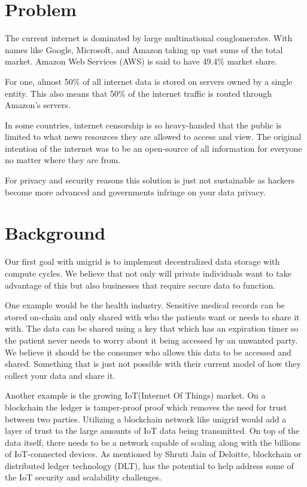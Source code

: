 \documentclass[12pt]{article}
\begin{document}
\newpage
\section*{Problem}

The current internet is dominated by large multinational conglomerates. With names like Google, Microsoft, and Amazon taking up vast sums of the total market. Amazon Web Services (AWS) is said to have 49.4\% market share\cite{jeb2019}.

For one, almost 50\% of all internet data is stored on servers owned by a single entity\cite{jeb2019}. This also means that 50\% of the internet traffic is routed through Amazon’s servers\cite{jeb2019}.

In some countries, internet censorship is so heavy-handed that the public is limited to what news resources they are allowed to access and view\cite{wiki2021}. The original intention of the internet was to be an open-source of all information for everyone no matter where they are from.

For privacy and security reasons this solution is just not sustainable as hackers become more advanced and governments infringe on your data privacy.


\section*{Background}
Our first goal with unigrid is to implement decentralized data storage with compute cycles. We believe that not only will private individuals want to take advantage of this but also businesses that require secure data to function.

One example would be the health industry. Sensitive medical records can be stored on-chain and only shared with who the patients want or needs to share it with. The data can be shared using a key that which has an expiration timer so the patient never needs to worry about it being accessed by an unwanted party. We believe it should be the consumer who allows this data to be accessed and shared. Something that is just not possible with their current model of how they collect your data and share it.

Another example is the growing IoT(Internet Of Things) market. On a blockchain the ledger is tamper-proof proof which removes the need for trust between two parties. Utilizing a blockchain network like unigrid would add a layer of trust to the large amounts of IoT data being transmitted. On top of the data itself, there needs to be a network capable of scaling along with the billions of IoT-connected devices. As mentioned by Shruti Jain of Deloitte\cite{jain2021}, blockchain or distributed ledger technology (DLT), has the potential to help address some of the IoT security and scalability challenges.
\end{document}
